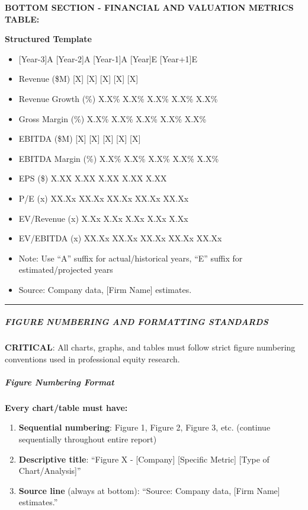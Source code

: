\documentclass[11pt]{article}
\begin{document}
\textbf{BOTTOM SECTION - FINANCIAL AND VALUATION METRICS TABLE:}

\textbf{Structured Template}
\begin{itemize}[leftmargin=*,itemsep=2pt,topsep=2pt]
\item {} [Year-3]A [Year-2]A [Year-1]A [Year]E [Year+1]E
\item {} Revenue (\$M) [X] [X] [X] [X] [X]
\item {} Revenue Growth (\%) X.X\% X.X\% X.X\% X.X\% X.X\%
\item {} Gross Margin (\%) X.X\% X.X\% X.X\% X.X\% X.X\%
\item {} EBITDA (\$M) [X] [X] [X] [X] [X]
\item {} EBITDA Margin (\%) X.X\% X.X\% X.X\% X.X\% X.X\%
\item {} EPS (\$) X.XX X.XX X.XX X.XX X.XX
\item {} P/E (x) XX.Xx XX.Xx XX.Xx XX.Xx XX.Xx
\item {} EV/Revenue (x) X.Xx X.Xx X.Xx X.Xx X.Xx
\item {} EV/EBITDA (x) XX.Xx XX.Xx XX.Xx XX.Xx XX.Xx
\item {} Note: Use ``A'' suffix for actual/historical years, ``E'' suffix for estimated/projected years
\item {} Source: Company data, [Firm Name] estimates.
\end{itemize}

\vspace{0.5em}\hrule\vspace{0.5em}

\subparagraph{FIGURE NUMBERING AND FORMATTING STANDARDS}\mbox{}\par

\textbf{CRITICAL}: All charts, graphs, and tables must follow strict figure numbering conventions used in professional equity research.


\subparagraph{Figure Numbering Format}\mbox{}\par

\textbf{Every chart/table must have:}

\begin{enumerate}[leftmargin=*,itemsep=2pt,topsep=2pt]
\item {} \textbf{Sequential numbering}: Figure 1, Figure 2, Figure 3, etc. (continue sequentially throughout entire report)
\item {} \textbf{Descriptive title}: ``Figure X - [Company] [Specific Metric] [Type of Chart/Analysis]''
\item {} \textbf{Source line} (always at bottom): ``Source: Company data, [Firm Name] estimates.''
\end{enumerate}
\end{document}
